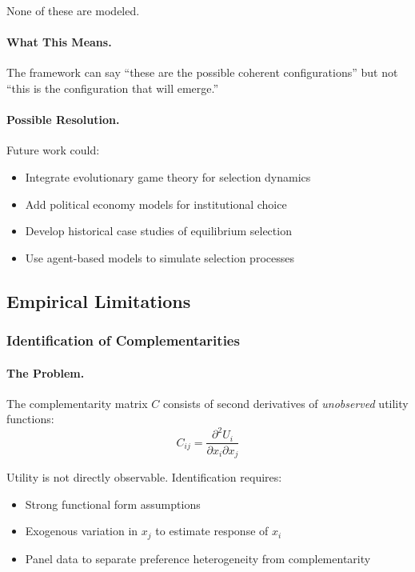 \documentclass[12pt,a4paper]{article}
\begin{document}
None of these are modeled.

\paragraph{What This Means.}
The framework can say ``these are the possible coherent configurations''
but not ``this is the configuration that will emerge.''

\paragraph{Possible Resolution.}
Future work could:
\begin{itemize}
  \item Integrate evolutionary game theory for selection dynamics
  \item Add political economy models for institutional choice
  \item Develop historical case studies of equilibrium selection
  \item Use agent-based models to simulate selection processes
\end{itemize}

\subsection{Empirical Limitations}

\subsubsection{Identification of Complementarities}

\paragraph{The Problem.}
The complementarity matrix $C$ consists of second derivatives of \emph{unobserved}
utility functions:
\begin{equation}
  C_{ij} = \frac{\partial^2 U_i}{\partial x_i \partial x_j}
\end{equation}

Utility is not directly observable. Identification requires:
\begin{itemize}
  \item Strong functional form assumptions
  \item Exogenous variation in $x_j$ to estimate response of $x_i$
  \item Panel data to separate preference heterogeneity from complementarity
\end{itemize}
\end{document}
